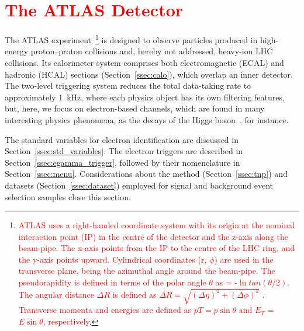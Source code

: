 \section{\textcolor{red}{The ATLAS Detector}}\label{sec:context}



The ATLAS experiment~\cite{PERF-2007-01}\footnote{\textcolor{red}{ATLAS uses a right-handed coordinate system with its origin at the nominal interaction point (IP) in the centre of the detector and the z-axis along the beam-pipe. The x-axis points from the IP to the centre of the LHC ring, and the y-axis points upward. Cylindrical coordinates (r, $\phi$) are used in the transverse plane, \phi being the azimuthal angle around the beam-pipe. The pseudorapidity is defined in terms of the polar angle $\theta$ as \eta = -$\ln{tan(\theta/2)}$. The angular distance $\Delta R$ is defined as $\Delta R = \sqrt{(\Delta\eta)^{2} + (\Delta\phi)^{2}}$ . Transverse momenta and energies are defined as $pT = p\sin\theta$ and $E_{T}$ = $E\sin\theta$, respectively}.} is designed to observe particles
produced in high-energy proton--proton collisions and, hereby not addressed,
heavy-ion LHC collisions. Its calorimeter system comprises both 
electromagnetic (ECAL) and hadronic (HCAL)
sections (Section~\ref{ssec:calo}), which overlap an inner detector. The two-level triggering system reduces the total
data-taking rate to approximately 1~kHz, where each physics object has its own
filtering features, but, here, we focus on electron-based channels, which are
found in many interesting physics phenomena, as the decays of the Higgs
boson~\cite{HIGG-2012-27,HIGG-2016-33}, for instance.



The standard variables for electron identification are discussed in
Section~\ref{ssec:std_variables}. The electron triggers are described in
Section~\ref{ssec:egamma_trigger}, followed by their nomenclature in
Section~\ref{ssec:menu}.  Considerations about the \TnP method
(Section~\ref{ssec:tnp}) and datasets (Section~\ref{ssec:dataset}) employed for
signal and background event selection samples close this section.




